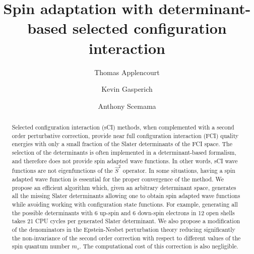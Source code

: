 \documentclass[aip,jcp,reprint,showkeys]{revtex4-1}
\newcommand{\stwo}{\hat{S}^2}
\newcommand{\sci}{sCI}
\newcommand{\cpu}{CPU}
\begin{document}
\title{Spin adaptation with determinant-based selected configuration
interaction}

\author{Thomas Applencourt}
\author{Kevin Gasperich}
\author{Anthony Scemama}

\begin{abstract}
Selected configuration interaction ({\sci}) methods, when complemented with
a second order perturbative correction, provide near full configuration interaction (FCI)
quality energies with only a small fraction of the Slater determinants of the FCI
space. The selection of the determinants is often implemented in a determinant-based 
formalism, and therefore does not provide spin adapted wave functions. In
other words, {\sci} wave functions are not eigenfunctions of the $\stwo$ operator.
In some situations, having a spin adapted wave function is essential for the
proper convergence of the method.
We propose an efficient algorithm which, given an arbitrary
determinant space, generates all the missing Slater determinants allowing one to
obtain spin adapted wave functions while avoiding working with configuration
state functions. For example,
generating all the possible determinants with 6 up-spin and 6 down-spin
electrons in 12 open shells takes 21 {\cpu} cycles per generated Slater
determinant. We also propose a modification of the denominators in the
Epstein-Nesbet perturbation theory reducing significantly the non-invariance of
the second order correction with respect to different values of the spin
quantum number $m_s$. The computational cost of this correction is also
negligible.
\end{abstract}


\maketitle
\end{document}
